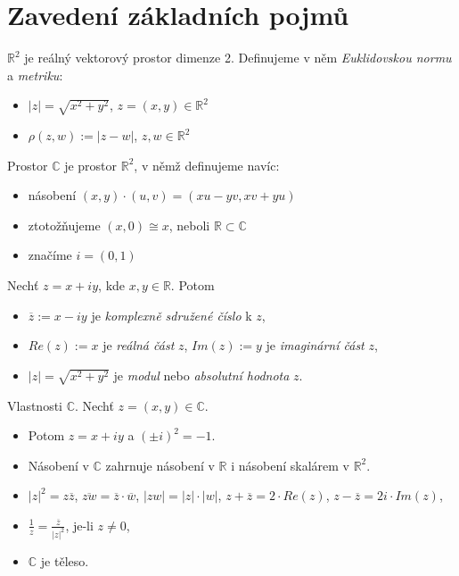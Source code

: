 \section{\texorpdfstring{Zavedení základních pojmů}{Zavedení základních pojmu}}
\vspace{5mm}
\large


\textbf{$\mathbb{R}^2$} je reálný vektorový prostor dimenze 2. Definujeme v něm \emph{Euklidovskou normu} a \emph{metriku}:
\begin{itemize}
    \item $|z| = \sqrt{x^2+y^2}$, $z = (x,y)\in\mathbb{R}^2$
    \item $\rho(z,w):= |z-w|$, $z,w\in\mathbb{R}^2$
\end{itemize}

\begin{definition}
Prostor $\mathbb{C}$ je prostor $\mathbb{R}^2$, v němž definujeme navíc:
\begin{itemize}
    \item násobení $(x,y)\cdot(u,v) = (xu-yv, xv+yu)$
    \item ztotožňujeme $(x,0) \cong x$, neboli $\mathbb{R}\subset\mathbb{C}$
    \item značíme $i = (0,1)$
\end{itemize}
\end{definition}

\begin{notation}
Nechť $z = x+iy$, kde $x,y\in\mathbb{R}$. Potom
\begin{itemize}
    \item $\overline{z}:= x-iy$ je \textit{komplexně sdružené číslo} k $z$,
    \item $Re(z):= x$ je \textit{reálná část} $z$, $Im(z):= y$ je \textit{imaginární část} $z$,
    \item $|z| = \sqrt{x^2+y^2}$ je \textit{modul} nebo \textit{absolutní hodnota} $z$.
\end{itemize}
\end{notation} 

\begin{properties}
Vlastnosti $\mathbb{C}$. Nechť $z = (x,y)\in\mathbb{C}$.
\begin{itemize}
    \item Potom $z = x+iy$ a $(\pm i)^2 = -1$.
    \item Násobení v $\mathbb{C}$ zahrnuje násobení v $\mathbb{R}$ i násobení skalárem v $\mathbb{R}^2$.
    \item $|z|^2 = z\overline{z}$, $\overline{zw} = \overline{z} \cdot 
    \overline{w}$, $|zw| = |z|\cdot|w|$, $z+\overline{z} = 2\cdot Re(z)$, $z-\overline{z} = 2i\cdot Im(z)$,
    \item $\frac{1}{z} = \frac{\overline{z}}{|z|^2}$, je-li $z\neq 0$,
    \item $\mathbb{C}$ je těleso.
\end{itemize}
\end{properties}

